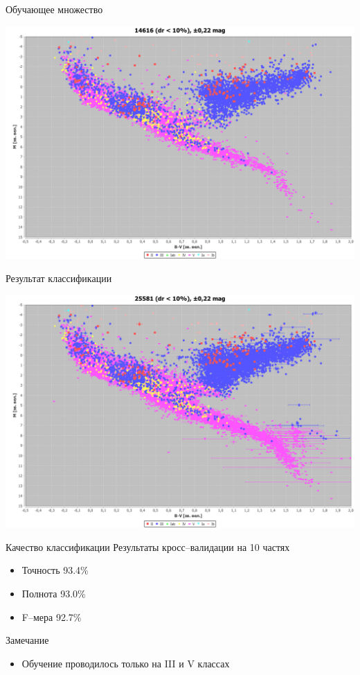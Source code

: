 \documentclass[14pt, fleqn, xcolor={dvipsnames, table}]{beamer}
\begin{document}
        \begin{frame}{Обучающее множество}
            \begin{center}
                \includegraphics[scale=0.25]{ml-1.png}
            \end{center}             
        \end{frame}
        
        \begin{frame}{Результат классификации}
            \begin{center}
                \includegraphics[scale=0.25]{ml-2.png}
            \end{center}             
        \end{frame}
        
        \begin{frame}{Качество классификации}
            Результаты кросс--валидации на 10 частях
            \begin{itemize}
                \item Точность 93.4\%
                \item Полнота 93.0\%
                \item F--мера 92.7\%
            \end{itemize}
            Замечание
            \begin{itemize}
                \item Обучение проводилось только на III и V классах
            \end{itemize}
        \end{frame}                  
        
\end{document}
